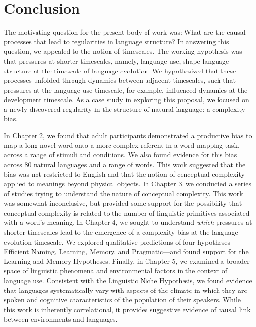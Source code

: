 
\chapter{Conclusion}
\label{chapter:conclusion}
The motivating question for the present body of work was: What are the causal processes that lead to regularities in language structure?   In answering this question, we appealed to the notion of timescales. The working hypothesis was that pressures at shorter timescales, namely, language use, shape language structure at the timescale of language evolution. We hypothesized that these processes unfolded through dynamics between adjacent timescales, such that pressures at the language use timescale, for example, influenced dynamics at the development timescale.  As a case study in exploring this proposal, we focused on a newly discovered regularity in the structure of natural language: a complexity bias.

In Chapter 2, we found that adult participants demonstrated a productive bias to map a long novel word onto a more complex referent in a word mapping task, across a range of stimuli and conditions. We  also found evidence for this bias across 80 natural languages and a range of words. This work suggested that  the bias was not restricted to English and that the notion of conceptual complexity applied to meanings beyond physical objects. In Chapter 3, we conducted a series of studies trying to understand the nature of conceptual complexity. This work was somewhat inconclusive, but provided some support for the possibility that conceptual complexity is related to the number of linguistic primitives associated with a word's meaning. In Chapter 4, we sought to understand {\it which} pressures at shorter timescales lead to the emergence of a complexity bias at the language evolution timescale. We explored qualitative predictions of four hypotheses---Efficient Naming, Learning, Memory, and Pragmatic---and found support for the Learning and Memory Hypotheses. Finally, in Chapter 5, we examined a broader space of linguistic phenomena and environmental factors in the context of language use. Consistent with the Linguistic Niche Hypothesis, we found evidence that languages systematically vary with aspects of the climate in which they are spoken and cognitive characteristics of the population of their speakers. While this work is inherently correlational, it provides suggestive evidence of causal link between environments and languages.

